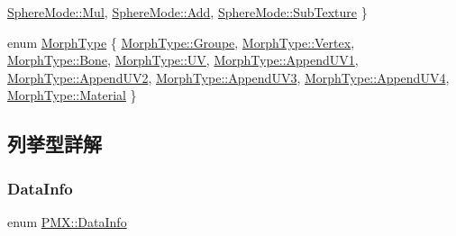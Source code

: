 \begin{DoxyCompactItemize}
\mbox{\hyperlink{namespace_p_m_x_aa20aa54267af9c3267c70e45f292aa9ba62b6d55816cf737bfc6f42e60df1a3f2}{Sphere\+Mode\+::\+Mul}}, 
\mbox{\hyperlink{namespace_p_m_x_aa20aa54267af9c3267c70e45f292aa9baec211f7c20af43e742bf2570c3cb84f9}{Sphere\+Mode\+::\+Add}}, 
\mbox{\hyperlink{namespace_p_m_x_aa20aa54267af9c3267c70e45f292aa9ba3055619d3a145ab45bcf06949c10416f}{Sphere\+Mode\+::\+Sub\+Texture}}
 \}
\item 
enum \mbox{\hyperlink{namespace_p_m_x_ab4c714816efbbef10f47cb13a83f5da6}{Morph\+Type}} \{ \newline
\mbox{\hyperlink{namespace_p_m_x_ab4c714816efbbef10f47cb13a83f5da6a68afae588b9f5dcf7cb2cb816535c125}{Morph\+Type\+::\+Groupe}}, 
\mbox{\hyperlink{namespace_p_m_x_ab4c714816efbbef10f47cb13a83f5da6ab22b929ba52471a02d18bb3a4e4472e6}{Morph\+Type\+::\+Vertex}}, 
\mbox{\hyperlink{namespace_p_m_x_ab4c714816efbbef10f47cb13a83f5da6ad790f0e7721581ed25c97eef3f5e9021}{Morph\+Type\+::\+Bone}}, 
\mbox{\hyperlink{namespace_p_m_x_ab4c714816efbbef10f47cb13a83f5da6adeaa2adbeb26802ae61609c3f3642d82}{Morph\+Type\+::\+UV}}, 
\newline
\mbox{\hyperlink{namespace_p_m_x_ab4c714816efbbef10f47cb13a83f5da6a15c076227c0dc40a9a7ba0f52bd65b5a}{Morph\+Type\+::\+Append\+U\+V1}}, 
\mbox{\hyperlink{namespace_p_m_x_ab4c714816efbbef10f47cb13a83f5da6a9c185a3115e32d5e1f7ac0d9874fbef9}{Morph\+Type\+::\+Append\+U\+V2}}, 
\mbox{\hyperlink{namespace_p_m_x_ab4c714816efbbef10f47cb13a83f5da6afa95a684b59d175f406273b00fc9c6da}{Morph\+Type\+::\+Append\+U\+V3}}, 
\mbox{\hyperlink{namespace_p_m_x_ab4c714816efbbef10f47cb13a83f5da6a7f5e41ae164c6de16a3f0109638487e5}{Morph\+Type\+::\+Append\+U\+V4}}, 
\newline
\mbox{\hyperlink{namespace_p_m_x_ab4c714816efbbef10f47cb13a83f5da6ad92a8333dd3ccb895cc65f7455b71206}{Morph\+Type\+::\+Material}}
 \}
\end{DoxyCompactItemize}


\subsection{列挙型詳解}
\mbox{\label{namespace_p_m_x_ac1ad92ba004e39031c2a870b9a4a3e26}} 
\subsubsection{\texorpdfstring{Data\+Info}{DataInfo}}
{\footnotesize\ttfamily enum \mbox{\hyperlink{namespace_p_m_x_ac1ad92ba004e39031c2a870b9a4a3e26}{P\+M\+X\+::\+Data\+Info}}\hspace{0.3cm}{\ttfamily [strong]}}

